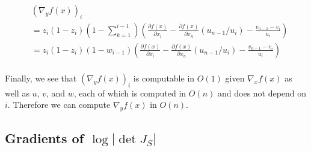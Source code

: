 \documentclass{article}
\begin{document}
\begin{align}
&\left( \nabla_y f(x) \right)_i \\
&=
z_i (1 - z_i) \left(1 - \sum_{k=1}^{i-1} \right) \left(
\frac{\partial f(x)}{\partial x_i}
- \frac{\partial f(x)}{\partial x_n} (u_{n-1} / u_i)
- \frac{v_{n-1} - v_i}{u_i} \right) \\
&=
z_i (1 - z_i) (1 - w_{i-1} ) \left(
\frac{\partial f(x)}{\partial x_i}
- \frac{\partial f(x)}{\partial x_n} (u_{n-1} / u_i)
- \frac{v_{n-1} - v_i}{u_i} \right) \\
\end{align}

Finally, we see that $\left( \nabla_y f(x) \right)_i$ is computable in $O(1)$
given $\nabla_x f(x)$ as well as $u$, $v$, and $w$, each of which is computed in
$O(n)$ and does not depend on $i$. Therefore we can compute $\nabla_y f(x)$ in
$O(n)$.


\subsection{Gradients of $\log |\det J_{S}|$}
\end{document}
